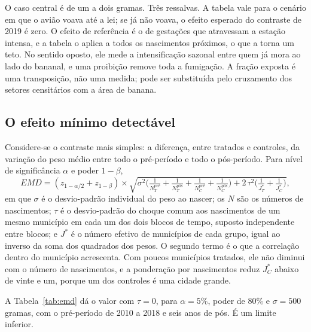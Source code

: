 O caso central é de um a dois gramas. Três ressalvas. A tabela vale para o
cenário em que o avião voava até a lei; se já não voava, o efeito esperado do
contraste de 2019 é zero. O efeito de referência é o de gestações que
atravessam a estação intensa, e a tabela o aplica a todos os nascimentos
próximos, o que a torna um teto. No sentido oposto, ele mede a intensificação
sazonal entre quem já mora ao lado do bananal, e uma proibição remove toda a
fumigação. A fração exposta é uma transposição, não uma medida; pode ser
substituída pelo cruzamento dos setores censitários com a área de banana.

\subsection{O efeito mínimo detectável}

Considere-se o contraste mais simples: a diferença, entre tratados e controles,
da variação do peso médio entre todo o pré-período e todo o pós-período. Para
nível de significância $\alpha$ e poder $1-\beta$,
\[
EMD = (z_{1-\alpha/2} + z_{1-\beta}) \times
\sqrt{\sigma^2\Big(\tfrac{1}{N_{T}^{\text{pré}}} + \tfrac{1}{N_{T}^{\text{pós}}} +
\tfrac{1}{N_{C}^{\text{pré}}} + \tfrac{1}{N_{C}^{\text{pós}}}\Big) + 2\,\tau^2\Big(\tfrac{1}{J_T^{*}}+\tfrac{1}{J_C^{*}}\Big)},
\]
em que $\sigma$ é o desvio-padrão individual do peso ao nascer; os $N$ são os
números de nascimentos; $\tau$ é o desvio-padrão do choque comum aos nascimentos
de um mesmo município em cada um dos dois blocos de tempo, suposto independente
entre blocos; e $J^{*}$ é o número efetivo de municípios de cada grupo, igual
ao inverso da soma dos quadrados dos pesos. O segundo termo é o que a
correlação dentro do município acrescenta. Com poucos municípios tratados, ele
não diminui com o número de nascimentos, e a ponderação por nascimentos reduz
$J_C^{*}$ abaixo de vinte e um, porque um dos controles é uma cidade grande.

A Tabela~\ref{tab:emd} dá o valor com $\tau = 0$, para $\alpha = 5\%$, poder de
80\% e $\sigma = 500$ gramas, com o pré-período de 2010 a 2018 e seis anos de
pós. É um limite inferior.

